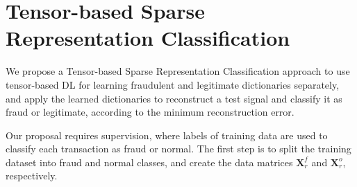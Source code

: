 




\section{Tensor-based Sparse Representation Classification}
\label{sec:4_proposal}

We propose a Tensor-based Sparse Representation Classification approach to use tensor-based DL for learning fraudulent and legitimate dictionaries separately, and apply the learned dictionaries to reconstruct a test signal and classify it as fraud or legitimate, according to the minimum reconstruction error.

Our proposal requires supervision, where labels of training data are used to classify each transaction as fraud or normal. The first step is to split the training dataset into fraud and normal classes, and create the data matrices $\textbf{X}_r^f$ and $\textbf{X}_r^o$, respectively. 

